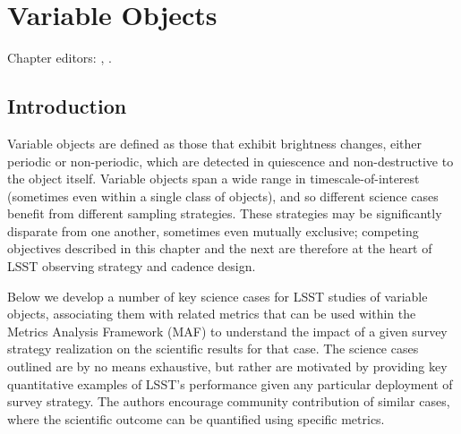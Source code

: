 
\chapter[Variable Objects]{Variable Objects}
\def\chpname{variables}\label{chp:\chpname}

Chapter editors:
,
.




\section{Introduction}

Variable objects are defined as those that exhibit brightness changes, either periodic or non-periodic, which are detected in quiescence and non-destructive to the object itself. Variable objects span a wide range in timescale-of-interest (sometimes even within a single class of objects), and so different science cases benefit from different sampling strategies. These strategies may be significantly disparate from one another, sometimes even mutually exclusive; competing objectives described in this chapter and the next are therefore at the heart of LSST observing strategy and cadence design.

Below we develop a number of key science cases for LSST studies of variable objects, associating them with related metrics that can be used within the Metrics Analysis Framework (MAF) to understand the impact of a given survey strategy realization on the scientific results for that case. The science cases outlined are by no means exhaustive, but rather are motivated by providing key quantitative examples of LSST's performance given any particular deployment of survey strategy. The authors encourage community contribution of similar cases, where the scientific outcome can be quantified using specific metrics. 




